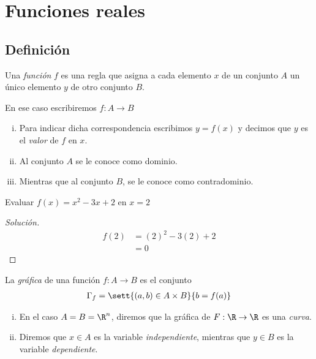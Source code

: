 \section{Funciones reales}

\subsection{Definición}
{}
  Una \emph{función} $f$ es una regla que asigna a cada elemento $x$ de un conjunto $A$ un único elemento $y$ de otro conjunto $B$. 
  
  En ese caso escribiremos $f:A \to B$

{}
\begin{enumerate}[(i)]
  \item 
  Para indicar dicha correspondencia escribimos $y=f(x)$ y decimos que $y$ es el \emph{valor} de $f$ en $x$. 
  \item Al conjunto $A$ se le conoce como dominio. 
  \item Mientras que al conjunto $B$, se le conoce como contradominio.
\end{enumerate}

{}
  \begin{problema}
   Evaluar $f(x)=x^{2}-3x+2$ en $x=2$
  \end{problema}

  \begin{proof}[Solución]
     \begin{align*} 
	f(2) &= (2)^{2}-3(2)+2 \\
   &=  0
   \end{align*}
  \end{proof}

{}
  \begin{definicion}
   La \emph{gráfica} de una función $f: A \to B$ es el conjunto 
       \begin{align*}    
   \Gamma_{f} = \sett{\left( a,b \right)\in A\times B}{b=f(a)}
    \end{align*}
  \end{definicion}


{}
\begin{enumerate}[(i)]
  \item 
  En el caso $A=B=\R^{n}$, diremos que la gráfica de $F:\R \to \R$ es una \emph{curva}. 
  
  \item Diremos que $x\in A$ es la variable \emph{independiente},  mientras que $y\in B$ es la variable \emph{dependiente}.
\end{enumerate}


